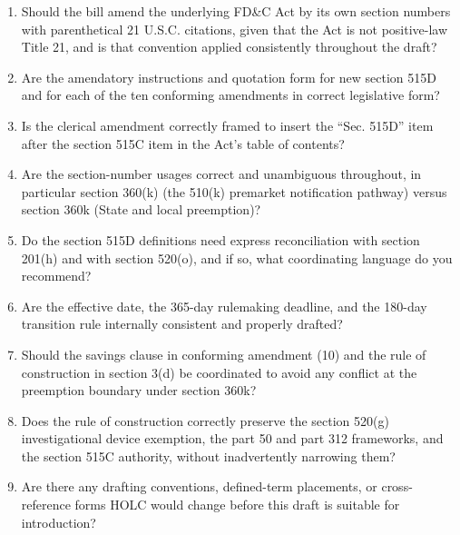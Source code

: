 \begin{enumerate}[leftmargin=2.0em,itemsep=2pt,topsep=2pt,label=(\arabic*)]
\item Should the bill amend the underlying FD\&C Act by its own section numbers with
parenthetical 21 U.S.C. citations, given that the Act is not positive-law Title 21,
and is that convention applied consistently throughout the draft?
\item Are the amendatory instructions and quotation form for new section 515D and for
each of the ten conforming amendments in correct legislative form?
\item Is the clerical amendment correctly framed to insert the ``Sec. 515D'' item
after the section 515C item in the Act's table of contents?
\item Are the section-number usages correct and unambiguous throughout, in particular
section 360(k) (the 510(k) premarket notification pathway) versus section 360k (State
and local preemption)?
\item Do the section 515D definitions need express reconciliation with section 201(h)
and with section 520(o), and if so, what coordinating language do you recommend?
\item Are the effective date, the 365-day rulemaking deadline, and the 180-day
transition rule internally consistent and properly drafted?
\item Should the savings clause in conforming amendment (10) and the rule of
construction in section 3(d) be coordinated to avoid any conflict at the preemption
boundary under section 360k?
\item Does the rule of construction correctly preserve the section 520(g)
investigational device exemption, the part 50 and part 312 frameworks, and the
section 515C authority, without inadvertently narrowing them?
\item Are there any drafting conventions, defined-term placements, or cross-reference
forms HOLC would change before this draft is suitable for introduction?
\end{enumerate}


